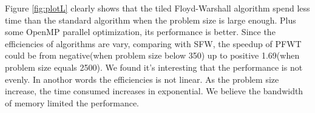 \documentclass[10pt]{article}
\begin{document}
Figure \ref{fig:plotL} clearly shows that the tiled Floyd-Warshall algorithm spend less time than the standard algorithm when the problem size is large enough. Plus some OpenMP parallel optimization, its performance is better. Since the efficiencies of algorithms are vary, comparing with SFW, the speedup of PFWT could be from negative(when problem size below 350) up to positive 1.69(when problem size equals 2500).
We found it's interesting that the performance is not evenly. In anothor words the efficiencies is not linear. As the problem size increase, the time consumed increases in exponential. We believe the bandwidth of memory limited the performance.



\end{document}
